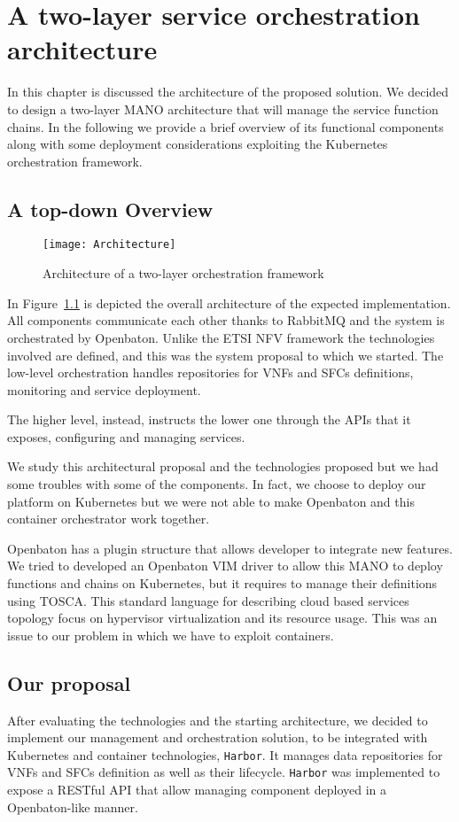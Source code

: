 \chapter{A two-layer service orchestration architecture}
\label{chap:archimpl}
 
In this chapter is discussed the architecture of the proposed solution.
We decided to design a two-layer MANO architecture that will manage
the service function chains. In the following we provide a brief overview of its functional components along with some deployment considerations exploiting the Kubernetes orchestration framework.

\section{A top-down Overview}
\begin{figure}[H]
  \centering
  \texttt{[image: Architecture]}
  \caption{Architecture of a two-layer orchestration framework}
  \label{chap:archimpl:img:architecture}
\end{figure}
In Figure~\ref{chap:archimpl:img:architecture} is depicted the overall
architecture of the expected implementation. All components communicate each
other thanks to RabbitMQ and the system is orchestrated by Openbaton. Unlike the
ETSI NFV framework the technologies involved are defined, and this was the
system proposal to which we started. The low-level orchestration handles
repositories for VNFs and SFCs definitions, monitoring and service deployment.

The higher level, instead, instructs the lower one through the APIs that it
exposes, configuring and managing services. 

We study this architectural proposal and the technologies proposed but we had
some troubles with some of the components. In fact, we choose to deploy our
platform on Kubernetes but we were not able to make Openbaton and this container
orchestrator work together.

Openbaton has a plugin structure that allows developer to integrate new
features. We tried to developed an Openbaton VIM driver to allow this MANO to
deploy functions and chains on Kubernetes, but it requires to manage their
definitions using TOSCA. This standard language for describing cloud based
services topology focus on hypervisor virtualization and its resource usage.
This was an issue to our problem in which we have to exploit containers.

\section{Our proposal}
After evaluating the technologies and the starting architecture, we decided to
implement our management and orchestration solution, to be integrated with
Kubernetes and container technologies, \texttt{Harbor}. It manages data
repositories for VNFs and SFCs definition as well as their lifecycle.
\texttt{Harbor} was implemented to expose a RESTful API that allow managing
component deployed in a Openbaton-like manner. 

